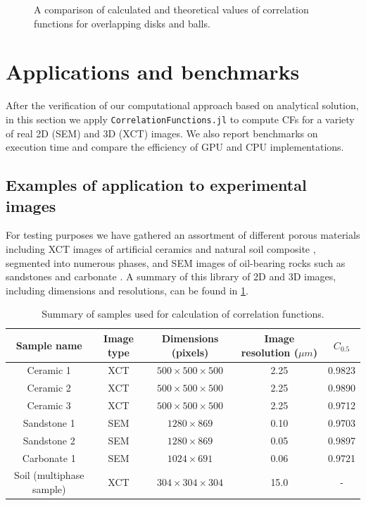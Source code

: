 \documentclass[1p]{elsarticle}
\newcommand{\code}[1]{\colorbox{light-gray}{\texttt{#1}}}
\begin{document}
\begin{figure}[tp]
{    \label{fig:ps}}
  \hfill
  \caption[]{A comparison of calculated and theoretical values of correlation
    functions for overlapping disks and balls.}
  \label{fig:verification}
\end{figure}

\section{Applications and benchmarks}
After the verification of our computational approach based on analytical
solution, in this section we apply \code{CorrelationFunctions.jl} to compute CFs
for a variety of real 2D (SEM) and 3D (XCT) images. We also report benchmarks on
execution time and compare the efficiency of GPU and CPU implementations.

\subsection{Examples of application to experimental images}
\label{sec:examples}
For testing purposes we have gathered an assortment of different porous
materials including XCT images of artificial ceramics \cite{ceramics} and
natural soil composite \cite{Geoderma2018}, segmented into numerous phases, and
SEM images of oil-bearing rocks such as sandstones and carbonate
\cite{samarin2023robust}.  A summary of this library of 2D and 3D images,
including dimensions and resolutions, can be found in \cref{tab:samples}.

\begin{table}[!pt]
  \centering
  \begin{tabular}{|c|c|c|c|c|}
    \hline
    Sample name & Image type & Dimensions (pixels) & Image resolution ($\mu m$) & $C_{0.5}$\\
    \hline
    Ceramic 1   & XCT & $500 \times 500 \times 500$ & 2.25 & 0.9823 \\
    Ceramic 2   & XCT & $500 \times 500 \times 500$ & 2.25 & 0.9890 \\
    Ceramic 3   & XCT & $500 \times 500 \times 500$ & 2.25 & 0.9712 \\
    Sandstone 1 & SEM &  $1280 \times 869$ & 0.10 & 0.9703 \\
    Sandstone 2 & SEM &  $1280 \times 869$ & 0.05 & 0.9897 \\
    Carbonate 1 & SEM &  $1024 \times 691$ & 0.06 & 0.9721 \\
    \hline
    Soil (multiphase sample) & XCT & $304 \times 304 \times 304$ &
    15.0 & - \\
    \hline
  \end{tabular}
  \caption{Summary of samples used for calculation of correlation functions.}
  \label{tab:samples}
\end{table}
\end{document}

